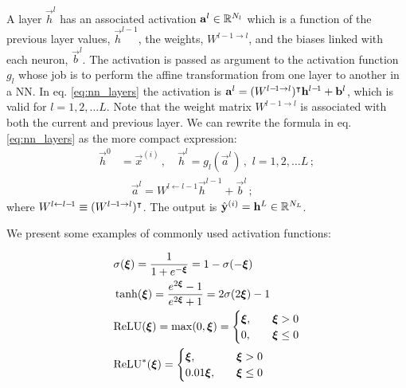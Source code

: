     A layer $\vec{h}^l$ has an associated activation $\vec{a}^l \in \RR[N_l]$ which is a function of the previous layer values, $\vec{h}^{l-\!1}$, the weights, $W^{l-\!1\to l}$, and the biases linked with each neuron, $\vec{b}^l$. The activation is passed as argument to the activation function $g_l$ whose job is to perform the affine transformation from one layer to another in a NN. In eq. \eqref{eq:nn_layers} the activation is $\vec{a}^l = (W^{l-\! 1\to l})\TT\vec{h}^{l -\!1} + \vec{b}^l$, which is valid for $l= 1, 2,\dots L$. Note that the weight matrix $W^{l-\! 1\to l}$ is associated with both the current and previous layer. We can rewrite the formula in eq. \eqref{eq:nn_layers} as the more compact expression:
    \begin{equation}\label{eq:NN_layers_compact}
        \begin{split}
            \vec{h}^0 &= \vec{x}^{(i)} \,,\quad \vec{h}^l =  g_l(\vec{a}^l)\,, \, \, l=1,2, \dots L \,; \\
            &\quad \vec{a}^l = W^{l\leftarrow l-\!1}\vec{h}^{l -\!1} + \vec{b}^l \,;
        \end{split}
    \end{equation}
    where $W^{l\leftarrow l-\!1} \equiv (W^{l-\! 1\to l})\TT$. The output is $\hat{\vec{y}}^{(i)} = \vec{h}^L \in \RR[N_L]$.

    We present some examples of commonly used activation functions:

    \begin{subequations}\label{eq:activation_functions}
        \begin{align}
            &\sigma(\svec{\xi}) = \frac{1}{1+e^{-\svec{\xi}}} = 1- \sigma(-\svec{\xi})\label{eq:sigmoid}\\
            &\tanh(\svec{\xi}) = \frac{e^{2\svec{\xi}}-1}{e^{2\svec{\xi}}+1} = 2\sigma(2\svec{\xi}) -1\label{eq:tanh} \\
            &\mathrm{ReLU}(\svec{\xi}) = \max(0,\svec{\xi}) = \begin{cases}
                \svec{\xi},\quad &\svec{\xi} >0 \\
                0,\quad &\svec{\xi} \leq 0
            \end{cases} \label{eq:relu}\\
            &\mathrm{ReLU}^*(\svec{\xi})  = \begin{cases}
                \svec{\xi},\quad &\svec{\xi} >0 \\
                0.01\svec{\xi},\quad &\svec{\xi} \leq 0
            \end{cases} \label{eq:leaky_relu}
        \end{align}
    \end{subequations}

